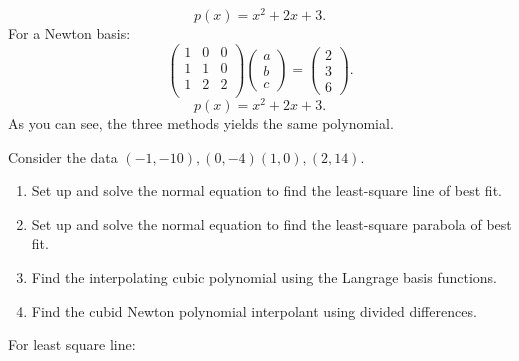 \documentclass[5pt, a4paper]{article}
\begin{document}
\[
p(x) = x^2 + 2x + 3
.\] 
For a Newton basis:
\[
\begin{pmatrix} 
    1 & 0 & 0 \\ 
    1 & 1 & 0 \\ 
    1 & 2 & 2 \\
\end{pmatrix} 
\begin{pmatrix} a \\ b \\ c \end{pmatrix} 
= \begin{pmatrix} 2 \\ 3 \\ 6 \end{pmatrix} 
.\] 
\[
p(x) = x^2 + 2x + 3
.\] 
As you can see, the three methods yields the same polynomial.
\begin{tcolorbox}[title=Question 5]
    Consider the data $(-1,-10),(0,-4)(1,0),(2,14)$.
     \begin{enumerate}
        \item Set up and solve the normal equation to find the least-square line
            of best fit.
        \item Set up and solve the normal equation to find the least-square
            parabola of best fit.
        \item Find the interpolating cubic polynomial using the Langrage basis
            functions.
        \item Find the cubid Newton polynomial interpolant using divided
            differences.
    \end{enumerate}
\end{tcolorbox}
For least square line:
\end{document}
